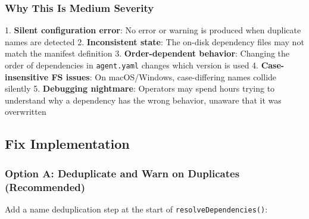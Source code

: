 \subsubsection*{Why This Is Medium Severity}

1. \textbf{Silent configuration error}: No error or warning is produced when duplicate names are detected
2. \textbf{Inconsistent state}: The on-disk dependency files may not match the manifest definition
3. \textbf{Order-dependent behavior}: Changing the order of dependencies in \texttt{agent.yaml} changes which version is used
4. \textbf{Case-insensitive FS issues}: On macOS/Windows, case-differing names collide silently
5. \textbf{Debugging nightmare}: Operators may spend hours trying to understand why a dependency has the wrong behavior, unaware that it was overwritten


\subsection*{Fix Implementation}
\subsubsection*{Option A: Deduplicate and Warn on Duplicates (Recommended)}

Add a name deduplication step at the start of \texttt{resolveDependencies()}:



